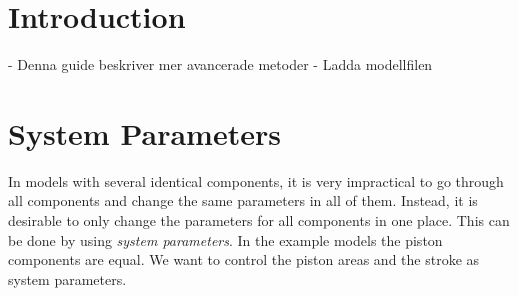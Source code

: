 \documentclass[a4paper,pdftex]{article}
\begin{document}

\section*{Introduction}
- Denna guide beskriver mer avancerade metoder
- Ladda modellfilen

\section{System Parameters}
In models with several identical components, it is very impractical to go through all components and change the same parameters in all of them.
Instead, it is desirable to only change the parameters for all components in one place. 
This can be done by using \textit{system parameters}. 
In the example models the piston components are equal.
We want to control the piston areas and the stroke as system parameters.
\end{document}
